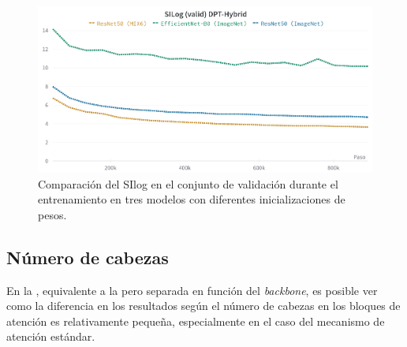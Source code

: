 \begin{figure}[H]
\centering
\includegraphics[width=0.95\linewidth]{imagenes/Resultados/ResNet50ImageNet.png} 
\captionsetup{width=.95\linewidth}
\caption{Comparación del SIlog en el conjunto de validación durante el entrenamiento en tres modelos con diferentes inicializaciones de pesos.}
\label{fig:mix6-imagenet}
\end{figure}














































\subsection{Número de cabezas}\label{resultados-cuantitativos-cabezas}

En la , equivalente a la  pero separada en función del \textit{backbone}, es posible ver como la diferencia en los resultados según el número de cabezas en los bloques de atención es relativamente pequeña, especialmente en el caso del mecanismo de atención estándar.

